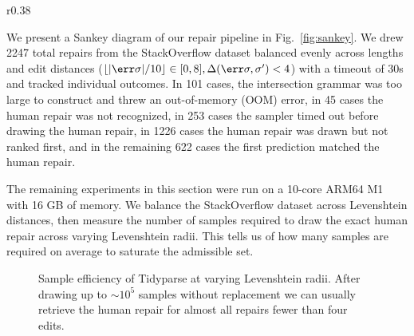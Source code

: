 \documentclass[runningheads]{llncs}
\begin{document}
  \begin{wrapfigure}{r}{0.38\textwidth}
    \vspace{-0.6cm}
    \hspace{-0.8cm}
    \resizebox{.47\textwidth}{!}{}
    \vspace{-1.4cm}
    \caption{Outcomes in the repair pipeline.}
    \label{fig:sankey}
  \end{wrapfigure}


  We present a Sankey diagram of our repair pipeline in Fig.~\ref{fig:sankey}. We drew 2247 total repairs from the StackOverflow dataset balanced evenly across lengths and edit distances ($\lfloor|\err\sigma| / 10\rfloor \in [0, 8], \Delta(\err\sigma, \sigma') < 4$) with a timeout of 30s and tracked individual outcomes. In 101 cases, the intersection grammar was too large to construct and threw an out-of-memory (OOM) error, in 45 cases the human repair was not recognized, in 253 cases the sampler timed out before drawing the human repair, in 1226 cases the human repair was drawn but not ranked first, and in the remaining 622 cases the first prediction matched the human repair.

  The remaining experiments in this section were run on a 10-core ARM64 M1 with 16 GB of memory. We balance the StackOverflow dataset across Levenshtein distances, then measure the number of samples required to draw the exact human repair across varying Levenshtein radii. This tells us of how many samples are required on average to saturate the admissible set.

  \begin{figure}[h!]
    
    \caption{Sample efficiency of Tidyparse at varying Levenshtein radii. After drawing up to $\sim10^5$ samples without replacement we can usually retrieve the human repair for almost all repairs fewer than four edits.}\label{fig:sample_efficiency}
  \end{figure}

\end{document}
